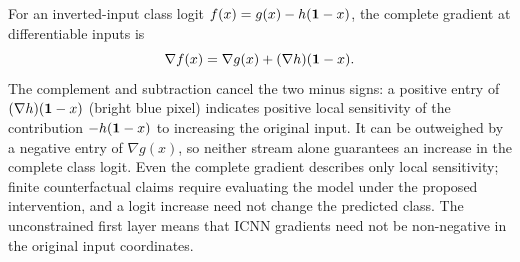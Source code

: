 For an inverted-input class logit $f(x)=g(x)-h(\mathbf{1}-x)$, the complete gradient at differentiable inputs is
\[
\nabla f(x)=\nabla g(x)+(\nabla h)(\mathbf{1}-x).
\]
The complement and subtraction cancel the two minus signs: a positive entry of $(\nabla h)(\mathbf{1}-x)$ (bright blue pixel) indicates positive local sensitivity of the contribution $-h(\mathbf{1}-x)$ to increasing the original input. It can be outweighed by a negative entry of $\nabla g(x)$, so neither stream alone guarantees an increase in the complete class logit. Even the complete gradient describes only local sensitivity; finite counterfactual claims require evaluating the model under the proposed intervention, and a logit increase need not change the predicted class. The unconstrained first layer means that ICNN gradients need not be non-negative in the original input coordinates.

